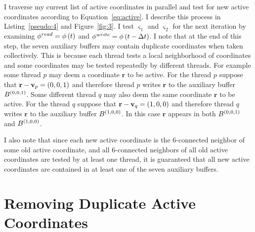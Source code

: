 I traverse my current list of active coordinates in parallel and test for new active coordinates according to Equation~\ref{eq:active}. I describe this process in Listing~\ref{pseudo:4} and Figure~\ref{fig:3}. I test $ { \varsigma }_{1} $ and $ { \varsigma }_{2} $ for the next iteration by examining $ \phi^{read} = \phi \left( t \right) $ and $ \phi^{write} = \phi \left( t - \Delta t \right)$. I note that at the end of this step, the seven auxiliary buffers may contain duplicate coordinates when taken collectively. This is because each thread tests a local neighborhood of coordinates and some coordinates may be tested repeatedly by different threads. For example some thread $p$ may deem a coordinate $\mathbf{r}$ to be active. For the thread $p$ suppose that $\mathbf{r}-\mathbf{v}_p = \left( 0,0,1 \right)$ and therefore thread $p$ writes $\mathbf{r}$ to the auxiliary buffer $B^{ \left( 0,0,1 \right) }$. Some different thread $q$ may also deem the same coordinate $\mathbf{r}$ to be active. For the thread $q$ suppose that $\mathbf{r} - \mathbf{v}_q = \left( 1,0,0 \right) $ and therefore thread $q$ writes $\mathbf{r}$ to the auxiliary buffer $B^{ \left( 1,0,0 \right) }$. In this case $\mathbf{r}$ appears in both $B^{ \left( 0,0,1 \right) }$ and $B^{ \left( 1,0,0 \right) }$.


I also note that since each new active coordinate is the 6-connected neighbor of some old active coordinate, and all 6-connected neighbors of all old active coordinates are tested by at least one thread, it is guaranteed that all new active coordinates are contained in at least one of the seven auxiliary buffers.


\section{Removing Duplicate Active Coordinates}
\label{subsec:removingDuplicateActiveCoordinates}



